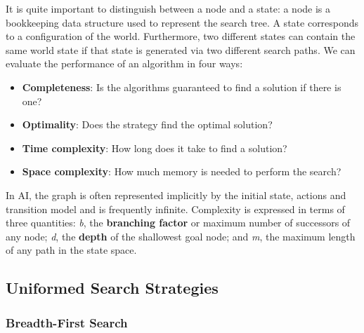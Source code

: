 \documentclass[twoside]{article}
\begin{document}
It is quite important to distinguish between a node and a state: a node is a 
bookkeeping data structure used to represent the search tree. A state 
corresponds to a configuration of the world. Furthermore, two different states
can contain the same world state if that state is generated via two different
search paths. We can evaluate the performance of an algorithm in four ways:
\begin{itemize}
    \item \textbf{Completeness}: Is the algorithms guaranteed to find a solution
    if there is one?
    \item \textbf{Optimality}: Does the strategy find the optimal solution?
    \item \textbf{Time complexity}: How long does it take to find a solution?
    \item \textbf{Space complexity}: How much memory is needed to perform the
    search?
\end{itemize}
In AI, the graph is often represented implicitly by the initial state, actions
and transition model and is frequently infinite. Complexity is expressed in
terms of three quantities: \emph{b}, the \textbf{branching factor} or maximum
number of successors of any node; \emph{d}, the \textbf{depth} of the shallowest
goal node; and \emph{m}, the maximum length of any path in the state space.

\subsection{Uniformed Search Strategies}
\subsubsection{Breadth-First Search}
\end{document}
